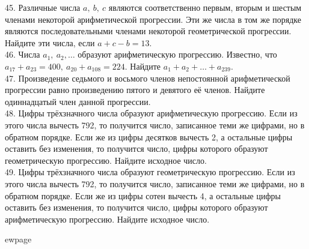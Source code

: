 45. Различные числа $a,\ b,\ c$ являются соответственно первым, вторым и шестым членами некоторой арифметической прогрессии. Эти же числа в том же порядке являются последовательными членами некоторой геометрической прогрессии. Найдите эти числа, если $a+c-b=13.$\\
46. Числа $a_1,\ a_2,\ldots$ образуют арифметическую прогрессию. Известно, что $a_{17}+a_{23}=400,\ a_{20}+a_{108}=224.$ Найдите $a_{1}+a_2+\ldots+a_{239}.$\\
47. Произведение седьмого и восьмого членов непостоянной арифметической прогрессии равно произведению пятого и девятого её членов. Найдите одиннадцатый член данной прогрессии.\\
48. Цифры трёхзначного числа образуют арифметическую прогрессию. Если из этого числа вычесть 792, то получится число, записанное теми же цифрами, но в обратном порядке. Если же из цифры десятков вычесть 2, а остальные цифры оставить без изменения, то получится число, цифры которого образуют геометрическую прогрессию. Найдите исходное число.\\
49. Цифры трёхзначного числа образуют геометрическую прогрессию. Если из этого числа вычесть 792, то получится число, записанное теми же цифрами, но в обратном порядке. Если же из цифры сотен вычесть 4, а остальные цифры оставить без изменения, то получится число, цифры которого образуют арифметическую прогрессию. Найдите исходное число.

ewpage
